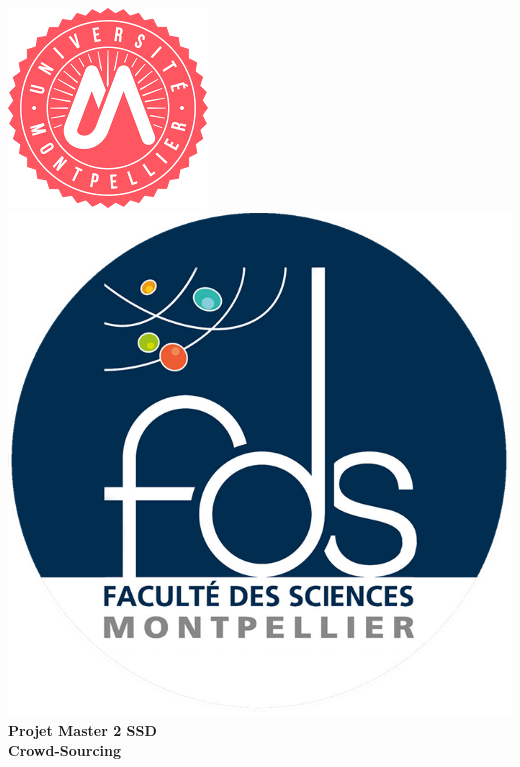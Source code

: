 \documentclass[frenchb]{report}
\newcommand{\1}{\mathbbm{1}}
\theoremstyle{definition}\newtheorem{defn}{Définition}
\theoremstyle{definition}\newtheorem{exm}{Exemple}
\theoremstyle{definition}\newtheorem{nota}{Notation}
\theoremstyle{definition}\newtheorem{rem}{Remarque}
\begin{document}
\def\appendixpage{\vspace*{8cm}
\begin{center}
\Huge\textbf{Annexes}
\end{center}
}
\def\appendixname{Annexe}%

\begin{titlepage}
\begin{center}
\includegraphics[scale=0.6]{logo.png}
\hfill
\includegraphics[scale=0.35]{fds_logo.png}\\[3cm]
\linespread{1.2}\huge {\bfseries Projet Master 2 SSD }\\[0.5cm]
\linespread{1.2}\LARGE {\bfseries Crowd-Sourcing}\\[1.5cm]
\linespread{1}


\end{center}
\end{titlepage}
\end{document}
